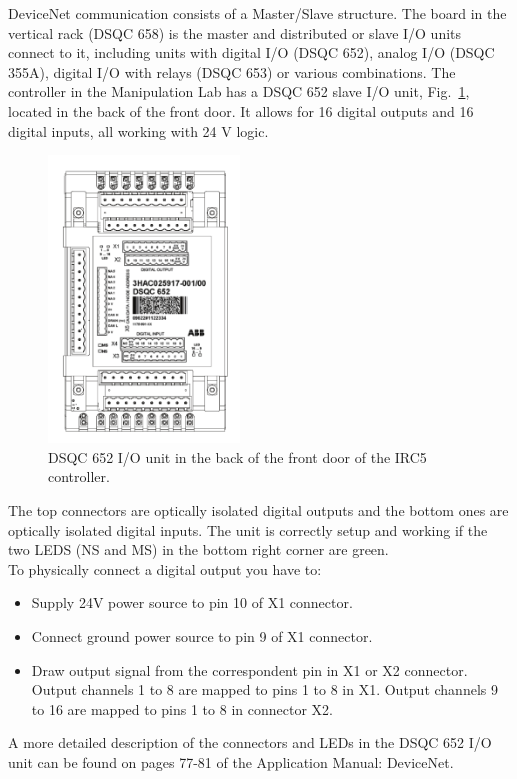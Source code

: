 \documentclass[letterpaper,notitlepage,10pt]{article}
\begin{document}
DeviceNet communication consists of a Master/Slave structure. The
board in the vertical rack (DSQC 658) is the master and distributed or
slave I/O units connect to it, including units with digital I/O (DSQC
652), analog I/O (DSQC 355A), digital I/O with relays (DSQC 653) or
various combinations.  The controller in the Manipulation Lab has a
DSQC 652 slave I/O unit, Fig.~\ref{fig:DSQC652}, located in the back
of the front door. It allows for 16 digital outputs and 16 digital
inputs, all working with 24 V logic.
%
\begin{figure}[h]
	\centering
		\includegraphics[width=2in]{figures/DSQC652}
                \caption{DSQC 652 I/O unit in the back of the front
                  door of the IRC5 controller.}
	\label{fig:DSQC652}
\end{figure}
%
The top connectors are optically isolated digital outputs and the
bottom ones are optically isolated digital inputs. The unit is
correctly setup and working if the two LEDS (NS and MS) in the bottom
right corner are green.
\\

To physically connect a digital output you have to:
\begin{itemize}
\item Supply 24V power source to pin 10 of X1 connector.
\item Connect ground power source to pin 9 of X1 connector.
\item Draw output signal from the correspondent pin in X1 or X2
  connector. Output channels 1 to 8 are mapped to pins 1 to 8 in
  X1. Output channels 9 to 16 are mapped to pins 1 to 8 in connector
  X2.
\end{itemize}

A more detailed description of the connectors and LEDs in the DSQC 652
I/O unit can be found on pages 77-81 of the Application Manual:
DeviceNet.
\end{document}
